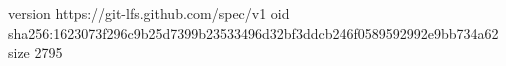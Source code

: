 version https://git-lfs.github.com/spec/v1
oid sha256:1623073f296c9b25d7399b23533496d32bf3ddcb246f0589592992e9bb734a62
size 2795

